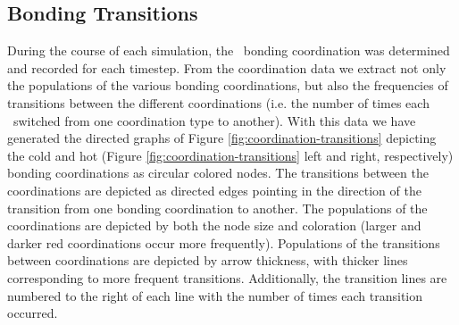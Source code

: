 \documentclass{article}
\begin{document}
\subsection {Bonding Transitions}

During the course of each simulation, the \suldiox~bonding coordination was determined and recorded for each timestep. From the coordination data we extract not only the populations of the various bonding coordinations, but also the frequencies of transitions between the different coordinations (i.e. the number of times each \suldiox~switched from one coordination type to another). With this data we have generated the directed graphs of Figure \ref{fig:coordination-transitions} depicting the cold and hot (Figure \ref{fig:coordination-transitions} left and right, respectively) bonding coordinations as circular colored nodes.\cite{Ellson2004,Gansner1999} The transitions between the coordinations are depicted as directed edges pointing in the direction of the transition from one bonding coordination to another. The populations of the coordinations are depicted by both the node size and coloration (larger and darker red coordinations occur more frequently). Populations of the transitions between coordinations are depicted by arrow thickness, with thicker lines corresponding to more frequent transitions. Additionally, the transition lines are numbered to the right of each line with the number of times each transition occurred. 
\end{document}
